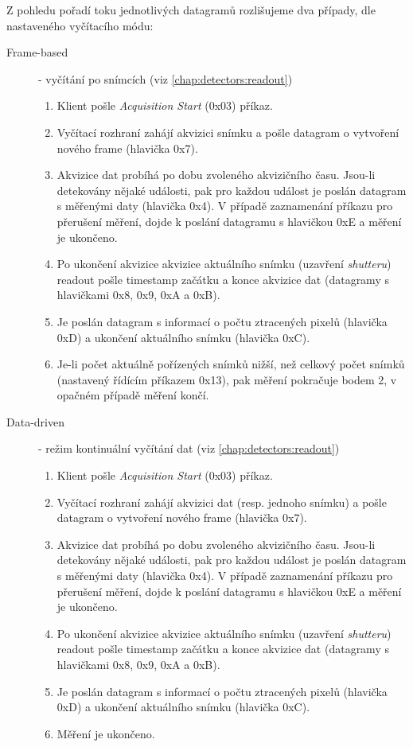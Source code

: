 Z pohledu pořadí toku jednotlivých datagramů rozlišujeme dva případy, dle nastaveného vyčítacího módu:
\begin{description}
   \item[Frame-based] - vyčítání po snímcích (viz \ref{chap:detectors:readout})
   \begin{enumerate}
       \item Klient pošle \textit{Acquisition Start} (0x03) příkaz.
       \item Vyčítací rozhraní zahájí akvizici snímku a pošle datagram o vytvoření nového frame (hlavička 0x7).
       \item Akvizice dat probíhá po dobu zvoleného akvizičního času. Jsou-li detekovány nějaké události, pak pro každou událost je poslán datagram s měřenými daty (hlavička 0x4). V případě zaznamenání příkazu pro přerušení měření, dojde k poslání datagramu s hlavičkou 0xE a měření je ukončeno.
       \item Po ukončení akvizice akvizice aktuálního snímku (uzavření \textit{shutteru}) readout pošle timestamp začátku a konce akvizice dat (datagramy s hlavičkami 0x8, 0x9, 0xA a 0xB).
       \item Je poslán datagram s informací o počtu ztracených pixelů (hlavička 0xD) a ukončení aktuálního snímku (hlavička 0xC).
       \item Je-li počet aktuálně pořízených snímků nižší, než celkový počet snímků (nastavený řídícím příkazem 0x13), pak měření pokračuje bodem 2, v opačném případě měření končí.
   \end{enumerate}
   \item[Data-driven] - režim kontinuální vyčítání dat (viz \ref{chap:detectors:readout})
   \begin{enumerate}
    \item Klient pošle \textit{Acquisition Start} (0x03) příkaz.
    \item Vyčítací rozhraní zahájí akvizici dat (resp. jednoho snímku) a pošle datagram o vytvoření nového frame (hlavička 0x7).
    \item Akvizice dat probíhá po dobu zvoleného akvizičního času. Jsou-li detekovány nějaké události, pak pro každou událost je poslán datagram s měřenými daty (hlavička 0x4). V případě zaznamenání příkazu pro přerušení měření, dojde k poslání datagramu s hlavičkou 0xE a měření je ukončeno.
    \item Po ukončení akvizice akvizice aktuálního snímku (uzavření \textit{shutteru}) readout pošle timestamp začátku a konce akvizice dat (datagramy s hlavičkami 0x8, 0x9, 0xA a 0xB).
    \item Je poslán datagram s informací o počtu ztracených pixelů (hlavička 0xD) a ukončení aktuálního snímku (hlavička 0xC).
    \item Měření je ukončeno.
\end{enumerate}
\end{description}

